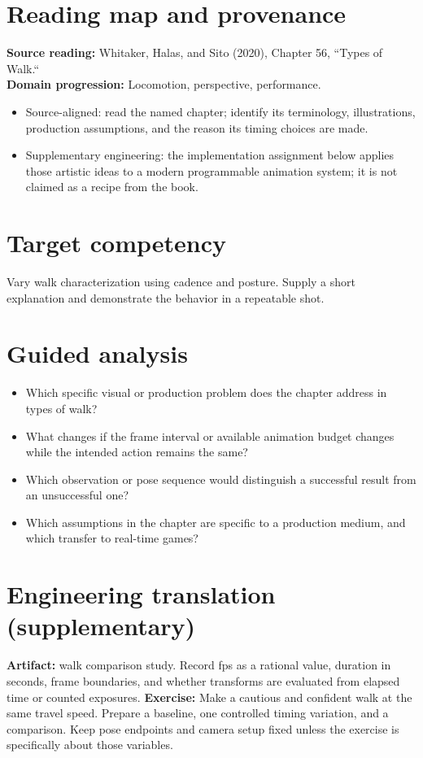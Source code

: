 \documentclass[10pt,letterpaper]{article}
\begin{document}
\makedoctitle
\makedocsummary

\section{Reading map and provenance}
\textbf{Source reading:} Whitaker, Halas, and Sito (2020), Chapter 56, ``Types of Walk.``\\
\textbf{Domain progression:} Locomotion, perspective, performance.
\begin{itemize}
\item Source-aligned: read the named chapter; identify its terminology, illustrations, production assumptions, and the reason its timing choices are made.
\item Supplementary engineering: the implementation assignment below applies those artistic ideas to a modern programmable animation system; it is not claimed as a recipe from the book.
\end{itemize}
\section{Target competency}
Vary walk characterization using cadence and posture. Supply a short explanation and demonstrate the behavior in a repeatable shot.
\section{Guided analysis}
\begin{itemize}
\item Which specific visual or production problem does the chapter address in types of walk?
\item What changes if the frame interval or available animation budget changes while the intended action remains the same?
\item Which observation or pose sequence would distinguish a successful result from an unsuccessful one?
\item Which assumptions in the chapter are specific to a production medium, and which transfer to real-time games?
\end{itemize}
\section{Engineering translation (supplementary)}
\textbf{Artifact:} walk comparison study. Record fps as a rational value, duration in seconds, frame boundaries, and whether transforms are evaluated from elapsed time or counted exposures.
\textbf{Exercise:} Make a cautious and confident walk at the same travel speed. Prepare a baseline, one controlled timing variation, and a comparison. Keep pose endpoints and camera setup fixed unless the exercise is specifically about those variables.
\end{document}
